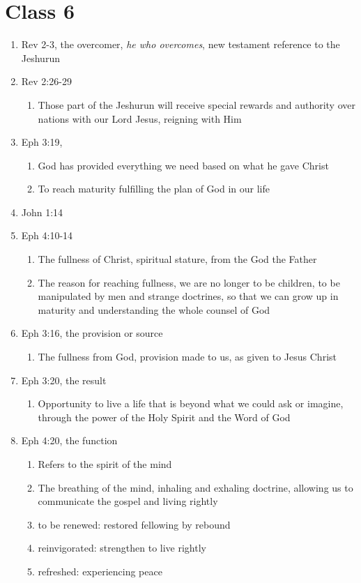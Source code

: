 \documentclass[11pt]{article}
\begin{document}
\section{Class 6}
\begin{enumerate}
	\item Rev 2-3, the overcomer, \emph{he who overcomes}, new testament reference to the Jeshurun
	\item Rev 2:26-29
	\begin{enumerate}
		\item Those part of the Jeshurun will receive special rewards and authority over nations with our Lord Jesus, reigning with Him
	\end{enumerate}
	\item Eph 3:19,
	\begin{enumerate}
		\item God has provided everything we need based on what he gave Christ
		\item To reach maturity fulfilling the plan of God in our life 
	\end{enumerate}
	\item John 1:14
	\item Eph 4:10-14
	\begin{enumerate}
		\item The fullness of Christ, spiritual stature, from the God the Father
		\item The reason for reaching fullness, we are no longer to be children, to be manipulated by men and strange doctrines, so that we can grow up in maturity and understanding the whole counsel of God
	\end{enumerate}
	\item Eph 3:16, the provision or source
	\begin{enumerate}
		\item The fullness from God, provision made to us, as given to Jesus Christ
	\end{enumerate}
	\item Eph 3:20, the result
	\begin{enumerate}
		\item Opportunity to live a life that is beyond what we could ask or imagine, through the power of the Holy Spirit and the Word of God
	\end{enumerate}
	\item Eph 4:20, the function
	\begin{enumerate}
		\item Refers to the spirit of the mind
		\item The breathing of the mind, inhaling and exhaling doctrine, allowing us to communicate the gospel and living rightly
		\item to be renewed: restored fellowing by rebound 
		\item reinvigorated: strengthen to live rightly
		\item refreshed: experiencing peace 
	\end{enumerate}


\end{enumerate}
\end{document}
